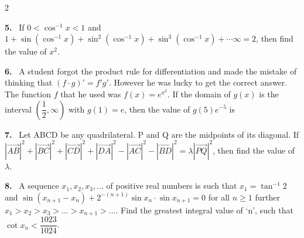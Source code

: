 \documentclass[10pt]{extarticle}
\newcommand{\qn}[1]{\par\smallskip\noindent\textbf{#1.}~}
\begin{document}
\begin{multicols}{2}
\qn{5} If $0<\cos^{-1}x<1$ and $1+\sin(\cos^{-1}x)+\sin^2(\cos^{-1}x)+\sin^3(\cos^{-1}x)+\cdots\infty=2$, then find the value of $x^2$.
\qn{6} A student forgot the product rule for differentiation and made the mistake of thinking that $(f\cdot g)'=f'g'$. However he was lucky to get the correct answer. The function $f$ that he used was $f(x)=e^{x^2}$. If the domain of $g(x)$ is the interval $\left(\dfrac12,\infty\right)$ with $g(1)=e$, then the value of $g(5)e^{-5}$ is
\qn{7} Let ABCD be any quadrilateral. P and Q are the midpoints of its diagonal. If $\left|\overrightarrow{AB}\right|^2+\left|\overrightarrow{BC}\right|^2+\left|\overrightarrow{CD}\right|^2+\left|\overrightarrow{DA}\right|^2-\left|\overrightarrow{AC}\right|^2-\left|\overrightarrow{BD}\right|^2=\lambda\left|\overrightarrow{PQ}\right|^2$, then find the value of $\lambda$.
\qn{8} A sequence $x_1,x_2,x_3,\ldots$ of positive real numbers is such that $x_1=\tan^{-1}2$ and $\sin(x_{n+1}-x_n)+2^{-(n+1)}\sin x_n\cdot\sin x_{n+1}=0$ for all $n\geqslant1$ further $x_1>x_2>x_3>\ldots>x_{n+1}>\ldots$. Find the greatest integral value of `n', such that $\cot x_n<\dfrac{1023}{1024}$.
\end{multicols}
\end{document}
